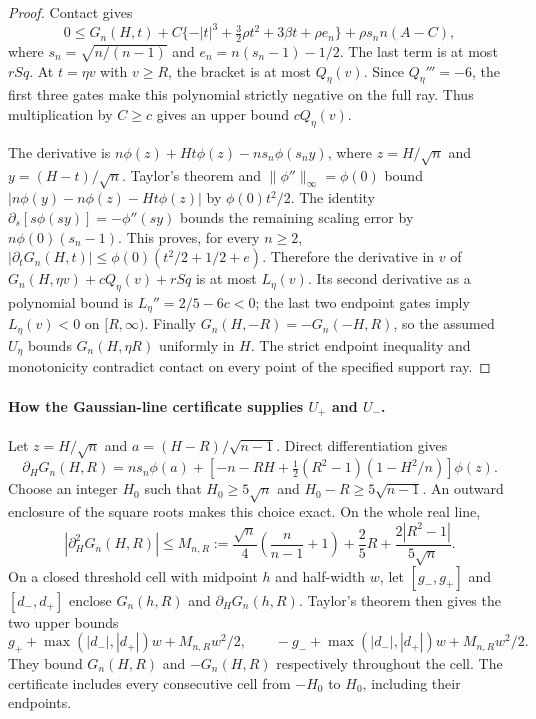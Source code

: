 \begin{proof}
Contact gives
\[
 0\le G_n(H,t)+
 C\{-|t|^3+\tfrac32\rho t^2+3\beta t+\rho e_n\}
 +\rho s_n n(A-C),
\]
where $s_n=\sqrt{n/(n-1)}$ and $e_n=n(s_n-1)-1/2$.
The last term is at most $rSq$. At $t=\eta v$ with $v\ge R$,
the bracket is at most $Q_\eta(v)$.
Since $Q_\eta'''=-6$, the first three gates make this polynomial
strictly negative on the full ray. Thus multiplication by $C\ge c$
gives an upper bound $cQ_\eta(v)$.

The derivative is
$n\phi(z)+Ht\phi(z)-ns_n\phi(s_ny)$, where
$z=H/\sqrt n$ and $y=(H-t)/\sqrt n$.
Taylor's theorem and $\|\phi''\|_\infty=\phi(0)$ bound
$|n\phi(y)-n\phi(z)-Ht\phi(z)|$ by $\phi(0)t^2/2$.
The identity $\partial_s[s\phi(sy)]=-\phi''(sy)$ bounds the
remaining scaling error by $n\phi(0)(s_n-1)$.
This proves, for every $n\ge2$,
$|\partial_tG_n(H,t)|\le\phi(0)(t^2/2+1/2+e)$.
Therefore the derivative in $v$ of
$G_n(H,\eta v)+cQ_\eta(v)+rSq$ is at most $L_\eta(v)$.
Its second derivative as a polynomial bound is
$L_\eta''=2/5-6c<0$; the last two endpoint gates imply
$L_\eta(v)<0$ on $[R,\infty)$.
Finally $G_n(H,-R)=-G_n(-H,R)$, so the assumed $U_\eta$
bounds $G_n(H,\eta R)$ uniformly in $H$.
The strict endpoint inequality and monotonicity contradict contact
on every point of the specified support ray.
\end{proof}

\paragraph{How the Gaussian-line certificate supplies $U_+$ and $U_-$.}
Let $z=H/\sqrt n$ and $a=(H-R)/\sqrt{n-1}$. Direct
differentiation gives
\[
 \partial_HG_n(H,R)=ns_n\phi(a)+
 \left[-n-RH+\tfrac12(R^2-1)(1-H^2/n)\right]\phi(z).
\]
Choose an integer $H_0$ such that
$H_0\ge5\sqrt n$ and $H_0-R\ge5\sqrt{n-1}$.
An outward enclosure of the square roots makes this choice exact.
On the whole real line,
\[
 |\partial_H^2G_n(H,R)|\le M_{n,R}
 :=\frac{\sqrt n}{4}\left(\frac n{n-1}+1\right)
   +\frac25R+\frac{2|R^2-1|}{5\sqrt n}.
\]
On a closed threshold cell with midpoint $h$ and half-width $w$,
let $[g_-,g_+]$ and $[d_-,d_+]$ enclose $G_n(h,R)$ and
$\partial_HG_n(h,R)$. Taylor's theorem then gives the two upper
bounds
\[
 g_++\max(|d_-|,|d_+|)w+M_{n,R}w^2/2,
 \qquad
 -g_-+\max(|d_-|,|d_+|)w+M_{n,R}w^2/2.
\]
They bound $G_n(H,R)$ and $-G_n(H,R)$ respectively throughout
the cell. The certificate includes every consecutive cell from
$-H_0$ to $H_0$, including their endpoints.

